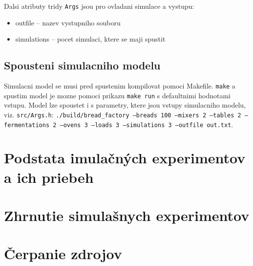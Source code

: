 \documentclass[a4paper, 10pt]{article}
\begin{document}
    Dalsi atributy tridy \texttt{Args} jsou pro ovladani simulace a vystupu:
    \begin{itemize}
        \item outfile -- nazev vystupniho souboru
        \item simulations -- pocet simulaci, ktere se maji spustit
    \end{itemize}

    \subsection{Spousteni simulacniho modelu}
    Simulacni model se musi pred spustenim kompilovat pomoci Makefile.
    \texttt{make} a spustim model je mozne pomoci prikazu \texttt{make run} s defaultnimi hodnotami vstupu.
    Model lze spoustet i s parametry, ktere jsou vstupy simulacniho modelu, viz. \texttt{src/Args.h}:
    \texttt{./build/bread_factory --breads 100 --mixers 2 --tables 2 --fermentations 2 --ovens 3 --loads 3 --simulations 3 --outfile out.txt}.


    \section{Podstata imulačných experimentov a ich priebeh}


    \section{Zhrnutie simulašnych experimentov}

    \section {Čerpanie zdrojov}
    {\cite{example}}

    \newpage
    
    
\end{document}

